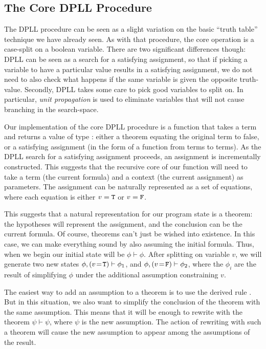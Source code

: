 \subsection{The Core DPLL Procedure}
\label{sec:dpll-procedure}

The DPLL procedure can be seen as a slight variation on the basic
``truth table'' technique we have already seen.  As with that
procedure, the core operation is a case-split on a boolean variable.
There are two significant differences though: DPLL can be seen as a
search for a satisfying assignment, so that if picking a variable to
have a particular value results in a satisfying assignment, we do not
need to also check what happens if the same variable is given the
opposite truth-value.  Secondly, DPLL takes some care to pick good
variables to split on.  In particular, \emph{unit propagation} is used
to eliminate variables that will not cause branching in the
search-space.

Our implementation of the core DPLL procedure is a function that takes
a term and returns a value of type : either a theorem
equating the original term to false, or a satisfying assignment (in
the form of a function from terms to terms).  As the DPLL search for a
satisfying assignment proceeds, an assignment is incrementally
constructed.  This suggests that the recursive core of our function
will need to take a term (the current formula) and a context (the
current assignment) as parameters.  The assignment can be naturally
represented as a set of equations, where each equation is either $v =
\holtxt{T}$ or $v = \holtxt{F}$.

This suggests that a natural representation for our program state is a
theorem: the hypotheses will represent the assignment, and the
conclusion can be the current formula.  Of course, \HOL{} theorems
can't just be wished into existence.  In this case, we can make
everything sound by also assuming the initial formula.  Thus, when we
begin our initial state will be $\phi\vdash\phi$.  After splitting on
variable $v$, we will generate two new states
$\phi,(v\!=\!\holtxt{T})\vdash \phi_1$, and
$\phi,(v\!=\!\holtxt{F})\vdash \phi_2$, where the $\phi_i$ are the
result of simplifying $\phi$ under the additional assumption
constraining $v$.

The easiest way to add an assumption to a theorem is to use the
derived rule .  But in this situation, we also want to
simplify the conclusion of the theorem with the same assumption.  This
means that it will be enough to rewrite with the theorem
$\psi\vdash\psi$, where $\psi$ is the new assumption.  The action of
rewriting with such a theorem will cause the new assumption to appear
among the assumptions of the result.

